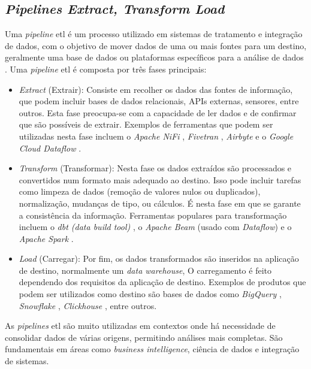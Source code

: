 \subsection{\textit{Pipelines Extract, Transform Load}}
\label{ch:etl}

Uma \textit{pipeline} \gls{etl} é um processo utilizado em sistemas de tratamento e integração de dados, com o objetivo de mover dados de uma ou mais fontes para um destino, geralmente uma base de dados ou plataformas específicos para a análise de dados \cite{vassiliadis2009survey}. Uma \textit{pipeline} \gls{etl} é composta por três fases principais:

\begin{itemize}
  \item \textit{Extract} (Extrair): Consiste em recolher os dados das fontes de informação, que podem incluir bases de dados relacionais, APIs externas, sensores, entre outros. Esta fase preocupa-se com a capacidade de ler dados e de confirmar que são possíveis de extrair.  Exemplos de ferramentas que podem ser utilizadas nesta fase incluem o \textit{Apache NiFi} \cite{apache_nifi}, \textit{Fivetran} \cite{fivetran}, \textit{Airbyte} \cite{airbyte} e o \textit{Google Cloud Dataflow} \cite{dataflow}.
  
  \item \textit{Transform} (Transformar): Nesta fase os dados extraídos são processados e convertidos num formato mais adequado ao destino. Isso pode incluir tarefas como limpeza de dados (remoção de valores nulos ou duplicados), normalização, mudanças de tipo, ou cálculos. É nesta fase em que se garante a consistência da informação. Ferramentas populares para transformação incluem o \textit{dbt (data build tool)} \cite{dbt}, o \textit{Apache Beam} \cite{apache_beam} (usado com \textit{Dataflow}) e o \textit{Apache Spark} \cite{apache_spark}.

  \item \textit{Load} (Carregar): Por fim, os dados transformados são inseridos na aplicação de destino, normalmente um \textit{data warehouse},  O carregamento é feito dependendo dos requisitos da aplicação de destino. Exemplos de produtos que podem ser utilizados como destino são bases de dados como \textit{BigQuery} \cite{bigquery}, \textit{Snowflake} \cite{snowflake}, \textit{Clickhouse} \cite{clickhouse}, entre outros.

\end{itemize}

As \textit{pipelines} \gls{etl} são muito utilizadas em contextos onde há necessidade de consolidar dados de várias origens, permitindo análises mais completas. São fundamentais em áreas como \textit{business intelligence}, ciência de dados e integração de sistemas.


